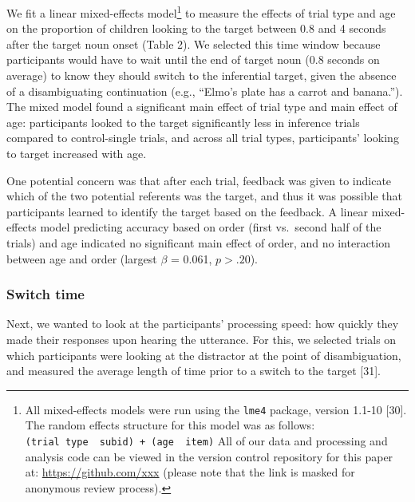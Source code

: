 \documentclass{rsos}
\begin{document}
We fit a linear mixed-effects model\footnote{All mixed-effects models
  were run using the \texttt{lme4} package, version 1.1-10 {[}30{]}. The
  random effects structure for this model was as follows:
  \texttt{(trial\ type\ \textbar{}\ subid)\ +\ (age\ \textbar{}\ item)}
  All of our data and processing and analysis code can be viewed in the
  version control repository for this paper at:
  \url{https://github.com/xxx} (please note that the link is masked for
  anonymous review process).} to measure the effects of trial type and
age on the proportion of children looking to the target between 0.8 and
4 seconds after the target noun onset (Table 2). We selected this time
window because participants would have to wait until the end of target
noun (0.8 seconds on average) to know they should switch to the
inferential target, given the absence of a disambiguating continuation
(e.g., ``Elmo's plate has a carrot and banana.''). The mixed model found
a significant main effect of trial type and main effect of age:
participants looked to the target significantly less in inference trials
compared to control-single trials, and across all trial types,
participants' looking to target increased with age.

One potential concern was that after each trial, feedback was given to
indicate which of the two potential referents was the target, and thus
it was possible that participants learned to identify the target based
on the feedback. A linear mixed-effects model predicting accuracy based
on order (first vs.~second half of the trials) and age indicated no
significant main effect of order, and no interaction between age and
order (largest \(\beta\) = 0.061, \(p >.20\)).

\subsubsection{Switch time}\label{switch-time}

Next, we wanted to look at the participants' processing speed: how
quickly they made their responses upon hearing the utterance. For this,
we selected trials on which participants were looking at the distractor
at the point of disambiguation, and measured the average length of time
prior to a switch to the target {[}31{]}.
\end{document}
